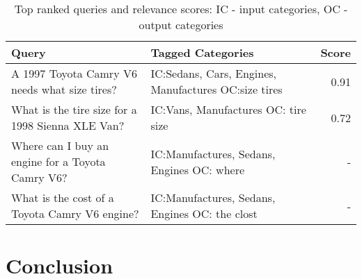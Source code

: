 \begin{table}[h]\footnotesize

\begin{tabular}{| p{3.5cm} | p{3cm} | r |}
\hline
Query & Tagged Categories & Score\\ \hline
A 1997 Toyota Camry V6 needs what size tires? & IC:Sedans, Cars, Engines, Manufactures OC:size tires & 0.91\\ \hline 
What is the tire size for a 1998 Sienna XLE Van? & IC:Vans, Manufactures OC: tire size & 0.72\\ \hline 
Where can I buy an engine for a Toyota Camry V6? & IC:Manufactures, Sedans, Engines OC: where & - \\ \hline 
What is the cost of a Toyota Camry V6 engine? &  IC:Manufactures, Sedans, Engines OC: the clost  & - \\ \hline
\end{tabular}        

\caption{Top ranked queries and relevance scores: IC - input categories, OC - output categories}
\label{tbl:ranked_queries}   

\end{table}


\section{Conclusion}

